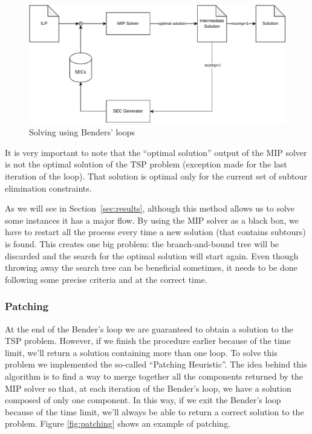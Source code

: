\documentclass{article}
\begin{document}
\begin{figure}[ht]
        \caption{Solving using Benders' loops}
        \label{fig:benders}
        \centering
        \includegraphics[width=340pt]{assets/bendersloops.drawio.pdf}
\end{figure}

It is very important to note that the ``optimal solution'' output of the
MIP solver is not the optimal solution of the TSP problem (exception made
for the last iteration of the loop). That solution is optimal only for the
current set of subtour elimination constraints.

As we will see in Section~\ref{sec:results}, although this method allows us to
solve some instances it has a major flow. By using the MIP solver as a black
box, we have to restart all the process every time a new solution (that
contains subtours) is found. This creates one big problem: the branch-and-bound
tree will be discarded and the search for the optimal solution will start again.
Even though throwing away the search tree can be beneficial sometimes, %
it needs to be done following some precise criteria and at the correct time.

\subsubsection{Patching}
At the end of the Bender's loop we are guaranteed to obtain a solution to the TSP problem.
However, if we finish the procedure earlier because of the time limit, we'll return a solution containing more than
one loop. To solve this problem we implemented the so-called ``Patching Heuristic''.
The idea behind this algorithm is to find a way to merge together all the components returned by the MIP solver
so that, at each iteration of the Bender's loop, we have a solution composed of only one component.
In this way, if we exit the Bender's loop because of the time limit, we'll always be able to return a
correct solution to the problem.
Figure \ref{fig:patching} shows an example of patching.
\end{document}
